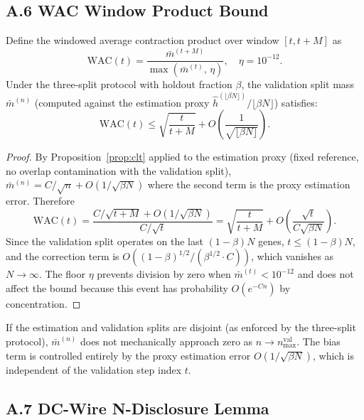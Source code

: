 \documentclass[11pt]{article}
\begin{document}
\subsection*{A.6 \quad WAC Window Product Bound}

\begin{proposition}\label{prop:wac}
Define the windowed average contraction product over window $[t, t+M]$ as
\[
  \mathrm{WAC}(t)
  = \frac{\bar{m}^{(t+M)}}{\max(\bar{m}^{(t)},\,\eta)},
  \quad \eta = 10^{-12}.
\]
Under the three-split protocol with holdout fraction $\beta$, the
validation split mass $\bar{m}^{(n)}$ (computed against the estimation
proxy $\hat{h}^{(\lfloor\beta N\rfloor)}/\lfloor\beta N\rfloor$) satisfies:
\[
  \mathrm{WAC}(t)
  \le \sqrt{\frac{t}{t+M}} + O\!\left(\frac{1}{\sqrt{\lfloor\beta N\rfloor}}\right).
\]
\end{proposition}

\begin{proof}
By Proposition~\ref{prop:clt} applied to the estimation proxy (fixed
reference, no overlap contamination with the validation split),
$\bar{m}^{(n)} = C/\sqrt{n} + O(1/\sqrt{\beta N})$ where the second
term is the proxy estimation error.  Therefore
\[
  \mathrm{WAC}(t)
  = \frac{C/\sqrt{t+M} + O(1/\sqrt{\beta N})}
         {C/\sqrt{t}}
  = \sqrt{\frac{t}{t+M}} + O\!\left(\frac{\sqrt{t}}{C\sqrt{\beta N}}\right).
\]
Since the validation split operates on the last $(1-\beta)N$ genes,
$t \le (1-\beta)N$, and the correction term is
$O((1-\beta)^{1/2}/(\beta^{1/2}\cdot C))$, which vanishes as $N\to\infty$.
The floor $\eta$ prevents division by zero when $\bar{m}^{(t)} < 10^{-12}$
and does not affect the bound because this event has probability
$O(e^{-Cn})$ by concentration.
\end{proof}

\begin{corollary}[No downward bias near $n=N$]
If the estimation and validation splits are disjoint (as enforced by the
three-split protocol), $\bar{m}^{(n)}$ does not mechanically approach
zero as $n \to n_{\max}^{\text{val}}$.  The bias term is controlled
entirely by the proxy estimation error $O(1/\sqrt{\beta N})$, which is
independent of the validation step index $t$.
\end{corollary}

\subsection*{A.7 \quad DC-Wire N-Disclosure Lemma}
\end{document}
